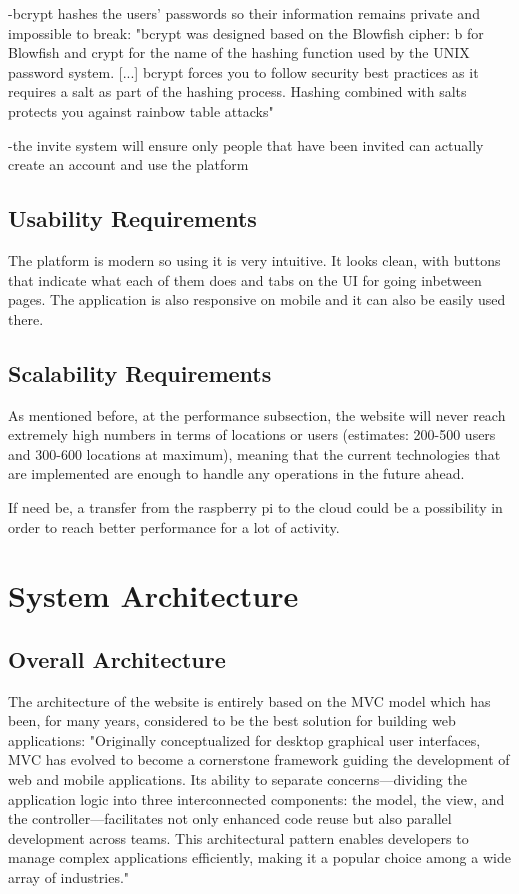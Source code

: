 \documentclass[12pt,a4paper]{report}
\begin{document}
-bcrypt hashes the users' passwords so their information remains private and impossible to break:
"bcrypt was designed based on the Blowfish cipher: b for Blowfish and crypt for the name of the hashing function used by the UNIX password system. [...] bcrypt forces you to follow security best practices as it requires a salt as part of the hashing process. Hashing combined with salts protects you against rainbow table attacks"~\cite{bcrypt}

-the invite system will ensure only people that have been invited can actually create an account and use the platform

\subsection{Usability Requirements}
The platform is modern so using it is very intuitive. It looks clean, with buttons that indicate what each of them does and tabs on the UI for going inbetween pages. The application is also responsive on mobile and it can also be easily used there.

\subsection{Scalability Requirements}
As mentioned before, at the performance subsection, the website will never reach extremely high numbers in terms of locations or users (estimates: 200-500 users and 300-600 locations at maximum), meaning that the current technologies that are implemented are enough to handle any operations in the future ahead.

If need be, a transfer from the raspberry pi to the cloud could be a possibility in order to reach better performance for a lot of activity.

\section{System Architecture}
\subsection{Overall Architecture}
The architecture of the website is entirely based on the MVC model which has been, for many years, considered to be the best solution for building web applications: "Originally conceptualized for desktop graphical user interfaces, MVC has evolved to become a cornerstone framework guiding the  development  of  web  and  mobile  applications.  Its  ability  to  separate  concerns—dividing  the application logic into three  interconnected  components:  the model, the view, and the  controller—facilitates  not  only  enhanced  code  reuse  but  also  parallel  development  across  teams.  This architectural  pattern  enables developers  to  manage complex  applications  efficiently, making  it  a popular choice among a wide array of industries."~\cite{mvcThesis}
\end{document}

